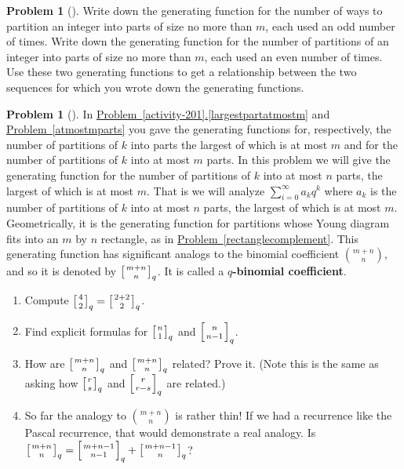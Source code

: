 \documentclass[10pt,]{book}
\newcommand{\terminology}[1]{\textbf{#1}}
\theoremstyle{plain}
\theoremstyle{definition}
\newtheorem{activity}[project]{Problem}
\theoremstyle{definition}
\numberwithin{equation}{chapter}
\newcommand{\importantarrow}{\Rightarrow}
\newcommand{\qchoose}[2]{\left[{#1\atop#2}\right]_q}
\begin{document}
\begin{activity}[]\marginsymbol[-1em]{} \label{activity-209}
Write down the generating function for the number of ways to partition an integer into parts of size no more than \(m\), each used an odd number of times. Write down the generating function for the number of partitions of an integer into parts of size no more than \(m\), each used an even number of times. Use these two generating functions to get a relationship between the two sequences for which you wrote down the generating functions.%
\end{activity}
\begin{activity}[]\marginsymbol[-1em]{\pdftooltip{$\importantarrow$}{especially interesting}} \label{qtorialformula}
In \hyperref[largestpartatmostm]{Problem~\ref{activity-201}.\ref{largestpartatmostm}} and \hyperref[atmostmparts]{Problem~\ref{atmostmparts}} you gave the generating functions for, respectively, the number of partitions of \(k\) into parts the largest of which is at most \(m\) and for the number of partitions of \(k\) into at most \(m\) parts. In this problem we will give the generating function for the number of partitions of \(k\) into at most \(n\) parts, the largest of which is at most \(m\). That is we will analyze \(\sum_{i=0}^\infty a_kq^k\) where \(a_k\) is the number of partitions of \(k\) into at most \(n\) parts, the largest of which is at most \(m\). Geometrically, it is the generating function for partitions whose Young diagram fits into an \(m\) by \(n\) rectangle, as in \hyperref[rectanglecomplement]{Problem~\ref{rectanglecomplement}}. This generating function has significant analogs to the binomial coefficient \(\binom{m+n}{n}\), and so it is denoted by \(\qchoose{m+n}{n}\). It is called a \terminology{\(q\)-binomial coefficient}.%
\begin{enumerate}[font=\bfseries,label=(\alph*),ref=\alph*]
\item\label{task-146} \marginsymbol[-2.5em]{} Compute \(\qchoose{4}{2}=\qchoose{2+2}{2}\).%
\item\label{task-147} \marginsymbol[-2.5em]{} Find explicit formulas for \(\qchoose{n}{1}\) and \(\qchoose{n}{n-1}\).%
\item\label{task-148} \marginsymbol[-2.5em]{} How are \(\qchoose{m+n}{n}\) and \(\qchoose{m+n}{n}\) related? Prove it. (Note this is the same as asking how \(\qchoose{r}{s}\) and \(\qchoose{r}{r-s}\) are related.)%
\item\label{task-149} \marginsymbol[-2.5em]{} So far the analogy to \(\binom{m+n}{n}\) is rather thin! If we had a recurrence like the Pascal recurrence, that would demonstrate a real analogy. Is \(\qchoose{m+n}{n}= \qchoose{m+n-1}{n-1}+\qchoose{m+n-1}{n}\)?%

\end{enumerate}
\end{activity}
\end{document}
